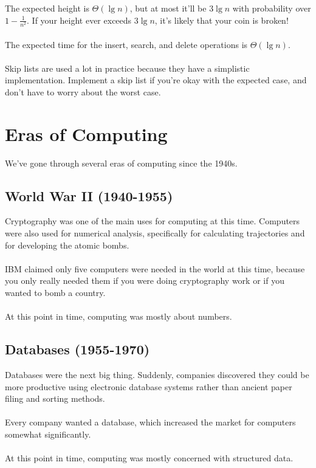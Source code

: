\documentclass[]{article}
\theoremstyle{definition}
\begin{document}
			\\ \\
			The expected height is $\Theta(\lg n)$, but at most it'll be $3 \lg n$ with probability over $1 - \frac{1}{n^2}$. If your height ever exceeds $3 \lg n$, it's likely that your coin is broken!
			\\ \\
			The expected time for the insert, search, and delete operations is $\Theta(\lg n)$.
			\\ \\
			Skip lists are used a lot in practice because they have a simplistic implementation. Implement a skip list if you're okay with the expected case, and don't have to worry about the worst case.

	\section{Eras of Computing}
		We've gone through several eras of computing since the 1940s.
		\subsection{World War II (1940-1955)}
			Cryptography was one of the main uses for computing at this time. Computers were also used for numerical analysis, specifically for calculating trajectories and for developing the atomic bombs.
			\\ \\
			IBM claimed only five computers were needed in the world at this time, because you only really needed them if you were doing cryptography work or if you wanted to bomb a country.
			\\ \\
			At this point in time, computing was mostly about numbers.

		\subsection{Databases (1955-1970)}
			Databases were the next big thing. Suddenly, companies discovered they could be more productive using electronic database systems rather than ancient paper filing and sorting methods.
			\\ \\
			Every company wanted a database, which increased the market for computers somewhat significantly.
			\\ \\
			At this point in time, computing was mostly concerned with structured data.
\end{document}
